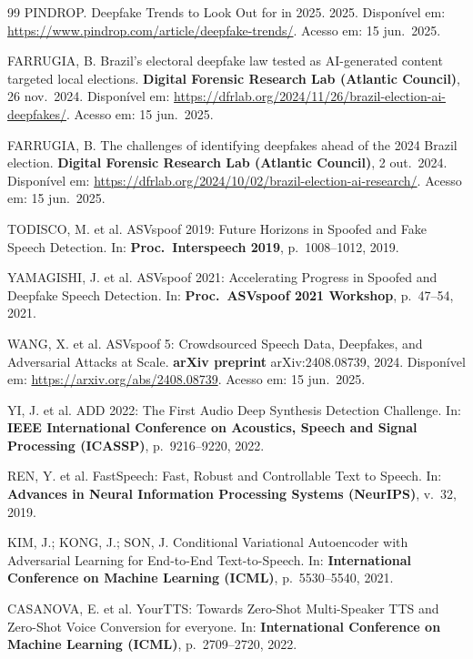 \documentclass[12pt,a4paper]{article}
\begin{document}
\begin{thebibliography}{99}
PINDROP.
Deepfake Trends to Look Out for in 2025.
2025.
Disponível em: \url{https://www.pindrop.com/article/deepfake-trends/}.
Acesso em: 15 jun.\ 2025.

FARRUGIA, B.
Brazil's electoral deepfake law tested as AI-generated content targeted local
elections.
\textbf{Digital Forensic Research Lab (Atlantic Council)}, 26 nov.\ 2024.
Disponível em:
\url{https://dfrlab.org/2024/11/26/brazil-election-ai-deepfakes/}.
Acesso em: 15 jun.\ 2025.

FARRUGIA, B.
The challenges of identifying deepfakes ahead of the 2024 Brazil election.
\textbf{Digital Forensic Research Lab (Atlantic Council)}, 2 out.\ 2024.
Disponível em: \url{https://dfrlab.org/2024/10/02/brazil-election-ai-research/}.
Acesso em: 15 jun.\ 2025.

TODISCO, M. et al.
ASVspoof 2019: Future Horizons in Spoofed and Fake Speech Detection.
In: \textbf{Proc.\ Interspeech 2019}, p.~1008--1012, 2019.

YAMAGISHI, J. et al.
ASVspoof 2021: Accelerating Progress in Spoofed and Deepfake Speech Detection.
In: \textbf{Proc.\ ASVspoof 2021 Workshop}, p.~47--54, 2021.

WANG, X. et al.
ASVspoof 5: Crowdsourced Speech Data, Deepfakes, and Adversarial Attacks at
Scale.
\textbf{arXiv preprint} arXiv:2408.08739, 2024.
Disponível em: \url{https://arxiv.org/abs/2408.08739}.
Acesso em: 15 jun.\ 2025.

YI, J. et al.
ADD 2022: The First Audio Deep Synthesis Detection Challenge.
In: \textbf{IEEE International Conference on Acoustics, Speech and Signal
Processing (ICASSP)}, p.~9216--9220, 2022.

REN, Y. et al.
FastSpeech: Fast, Robust and Controllable Text to Speech.
In: \textbf{Advances in Neural Information Processing Systems (NeurIPS)},
v.~32, 2019.

KIM, J.; KONG, J.; SON, J.
Conditional Variational Autoencoder with Adversarial Learning for End-to-End
Text-to-Speech.
In: \textbf{International Conference on Machine Learning (ICML)},
p.~5530--5540, 2021.

CASANOVA, E. et al.
YourTTS: Towards Zero-Shot Multi-Speaker TTS and Zero-Shot Voice Conversion
for everyone.
In: \textbf{International Conference on Machine Learning (ICML)},
p.~2709--2720, 2022.


\end{thebibliography}
\end{document}
